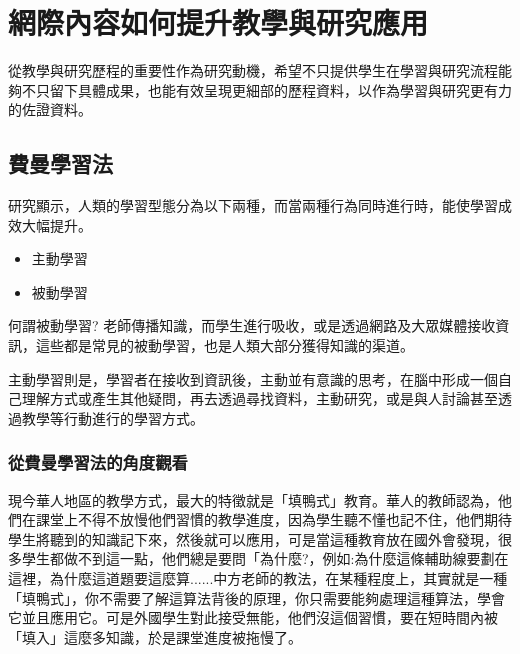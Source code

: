 \chapter{網際內容如何提升教學與研究應用}
\renewcommand{\baselinestretch}{10} %
\par
\renewcommand{\baselinestretch}{2} %
\twelve 從教學與研究歷程的重要性作為研究動機，希望不只提供學生在學習與研究流程能夠不只留下具體成果，也能有效呈現更細部的歷程資料，以作為學習與研究更有力的佐證資料。
\par

\renewcommand{\baselinestretch}{20} %
\section{費曼學習法}
\par
\renewcommand{\baselinestretch}{1} %
\twelve 研究顯示，人類的學習型態分為以下兩種，而當兩種行為同時進行時，能使學習成效大幅提升。
\begin{itemize}
	\item 主動學習
	\item 被動學習
\end{itemize}
\par
\renewcommand{\baselinestretch}{1} %
\twelve 何謂被動學習? 老師傳播知識，而學生進行吸收，或是透過網路及大眾媒體接收資訊，這些都是常見的被動學習，也是人類大部分獲得知識的渠道。
\par
\renewcommand{\baselinestretch}{1} %
\twelve 主動學習則是，學習者在接收到資訊後，主動並有意識的思考，在腦中形成一個自己理解方式或產生其他疑問，再去透過尋找資料，主動研究，或是與人討論甚至透過教學等行動進行的學習方式。
\\
\par

\renewcommand{\baselinestretch}{20} %
\subsection{從費曼學習法的角度觀看}
\par
\renewcommand{\baselinestretch}{1} %
\twelve 現今華人地區的教學方式，最大的特徵就是「填鴨式」教育。華人的教師認為，他們在課堂上不得不放慢他們習慣的教學進度，因為學生聽不懂也記不住，他們期待學生將聽到的知識記下來，然後就可以應用，可是當這種教育放在國外會發現，很多學生都做不到這一點，他們總是要問「為什麼?，例如:為什麼這條輔助線要劃在這裡，為什麼這道題要這麼算......中方老師的教法，在某種程度上，其實就是一種「填鴨式」，你不需要了解這算法背後的原理，你只需要能夠處理這種算法，學會它並且應用它。可是外國學生對此接受無能，他們沒這個習慣，要在短時間內被「填入」這麼多知識，於是課堂進度被拖慢了。
\par

